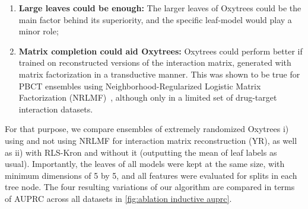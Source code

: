 \documentclass[sn-mathphys-num]{sn-jnl}%
\theoremstyle{thmstyleone}%
\theoremstyle{thmstyletwo}%
\theoremstyle{thmstylethree}%
\begin{document}
%
\begin{enumerate}
    \item \textbf{Large leaves could be enough:} The larger leaves of Oxytrees could be the main factor behind its superiority, and the specific leaf-model would play a minor role;
    \item \textbf{Matrix completion could aid Oxytrees:} Oxytrees could perform better if trained on reconstructed versions of the interaction matrix, generated with matrix factorization in a transductive manner. This was shown to be true for PBCT ensembles using Neighborhood-Regularized Logistic Matrix Factorization (NRLMF)~\cite{pliakos_drug-target_2020}, although only in a limited set of drug-target interaction datasets.
\end{enumerate}

For that purpose, we compare ensembles of extremely randomized Oxytrees i) using and not using NRLMF for interaction matrix reconstruction (YR), as well as ii) with RLS-Kron and without it (outputting the mean of leaf labels as usual). Importantly, the leaves of all models were kept at the same size, with minimum dimensions of 5 by 5, and all features were evaluated for splits in each tree node. The four resulting variations of our algorithm are compared in terms of AUPRC across all datasets in \autoref{fig:ablation inductive auprc}.
\end{document}
